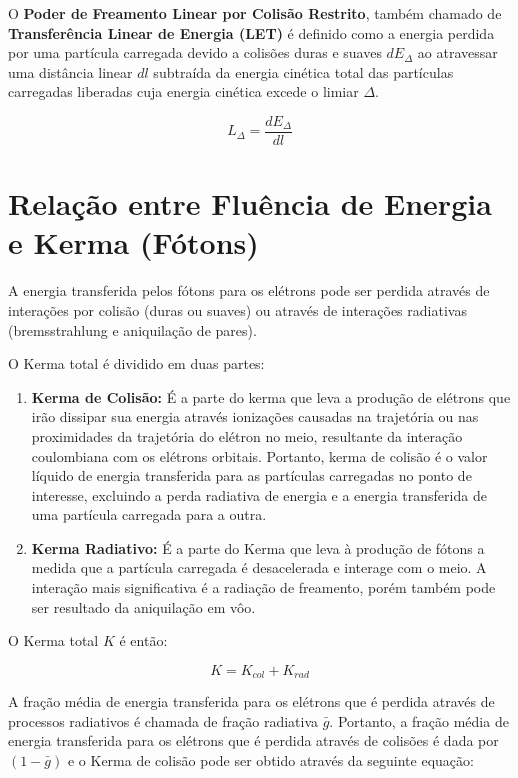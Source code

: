 \documentclass[11pt,a4paper]{article}
\begin{document}
		O \textbf{Poder de Freamento Linear por Colisão Restrito}, também chamado de \textbf{Transferência Linear de Energia (LET)} é definido como a energia perdida por uma partícula carregada devido a colisões duras e suaves $dE_\Delta$ ao atravessar uma distância linear $dl$ subtraída da energia cinética total das partículas carregadas liberadas cuja energia cinética excede o limiar $\Delta$.

			\begin{equation}
				L_\Delta = \frac{dE_\Delta}{dl}
			\end{equation}
	
		
	\section{Relação entre Fluência de Energia e Kerma (Fótons)}

		A energia transferida pelos fótons para os elétrons pode ser perdida através de interações por colisão (duras ou suaves) ou através de interações radiativas (bremsstrahlung e aniquilação de pares). 
		
		O Kerma total é dividido em duas partes:

		\begin{enumerate}
			\item \textcolor{CarnationPink}{\textbf{Kerma de Colisão:}} É a parte do kerma que leva a produção de elétrons que irão dissipar sua energia através ionizações causadas na trajetória ou nas proximidades da trajetória do elétron no meio, resultante da interação coulombiana com os elétrons orbitais. Portanto, kerma de colisão é o valor líquido de energia transferida para as partículas carregadas no ponto de interesse, excluindo a perda radiativa de energia e a energia transferida de uma partícula carregada para a outra.
			
			\item \textcolor{CarnationPink}{\textbf{Kerma Radiativo:}} É a parte do Kerma que leva à produção de fótons a medida que a partícula carregada é desacelerada e interage com o meio. A interação mais significativa é a radiação de freamento, porém também pode ser resultado da aniquilação em vôo.
		\end{enumerate}


		O Kerma total $K$ é então:

			\begin{equation}
				K = K_{col} + K_{rad}
			\end{equation}

		A fração média de energia transferida para os elétrons que é perdida através de processos radiativos é chamada de fração radiativa $\bar{g}$. Portanto, a fração média de energia transferida para os elétrons que é perdida através de colisões é dada por $(1 - \bar{g})$ e o Kerma de colisão pode ser obtido através da seguinte equação:
\end{document}
